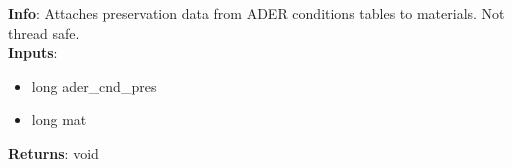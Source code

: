 \textbf{Info}: Attaches preservation data from ADER conditions tables to
materials. Not thread safe. \\

\noindent \textbf{Inputs}:
\begin{itemize}
\item{long ader\_cnd\_pres}
\item{long mat}
\end{itemize}

\noindent \textbf{Returns}: void
